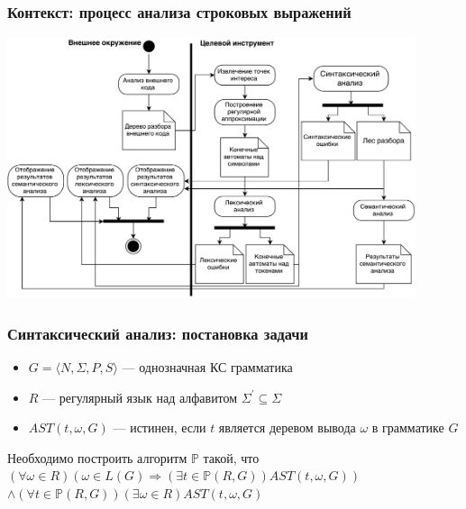 \documentclass{beamer}
\begin{document}

\begin{frame}
    \transwipe[direction=90]
    \frametitle{Контекст: процесс анализа строковых выражений}
    \begin{center}
        \includegraphics[width=340pt]{pictures/Activ_SEL_Processing.pdf}
    \end{center}
\end{frame}

\begin{frame}
    \transwipe[direction=90]
    \frametitle{Синтаксический анализ: постановка задачи}
    \begin{itemize}    
        \item $G=\langle N,\Sigma, P,S\rangle$ --- однозначная КС грамматика
        \item $R$ --- регулярный язык над алфавитом ${\Sigma}^{'} \subseteq \Sigma $
        \item $AST(t,\omega,G)$ --- истинен, если $t$ является деревом вывода $\omega$ в грамматике $G$
    \end{itemize}
    \begin{block}{}
    Необходимо построить алгоритм $\mathbb{P}$ такой, что
    $(\forall \omega \in R) (\omega \in L(G) \Rightarrow (\exists t \in \mathbb{P}(R,G))AST(t, \omega, G))$
    $\land (\forall t \in \mathbb{P}(R,G))(\exists \omega \in R)AST(t,\omega,G)$
    \end{block}
\end{frame}
\end{document}
